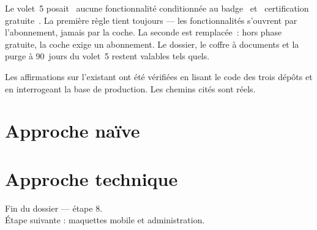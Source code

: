 \documentclass[11pt,a4paper,oneside]{report}
\begin{document}
\begin{alerte}
Le volet~5 posait \guillemotleft~aucune fonctionnalité conditionnée au badge~\guillemotright{}
et \guillemotleft~certification gratuite~\guillemotright. La première règle tient toujours ---
les fonctionnalités s'ouvrent par l'abonnement, jamais par la coche. La seconde est remplacée~:
hors phase gratuite, la coche exige un abonnement. Le dossier, le coffre à documents et la
purge à 90~jours du volet~5 restent valables tels quels.
\end{alerte}

\begin{constat}[Méthode]
Les affirmations sur l'existant ont été vérifiées en lisant le code des trois dépôts et en
interrogeant la base de production. Les chemins cités sont réels.
\end{constat}

\tableofcontents

\part{Approche naïve}



\part{Approche technique}



\vfill
\begin{center}\small\color{AlanyaGray}\sffamily
Fin du dossier --- étape 8. \\
Étape suivante : maquettes mobile et administration.
\end{center}
\end{document}

